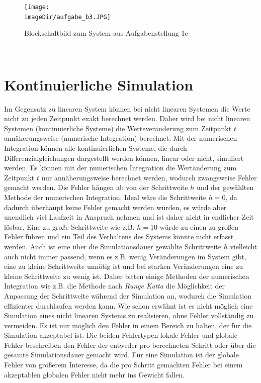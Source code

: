\documentclass[11pt, a4paper, twoside]{article}   	%
\newcommand{\imageDir}{./images/}
\begin{document}
\begin{figure}
\centering
\texttt{[image: \\imageDir/aufgabe\_b3.JPG]}
\caption{Blockschaltbild zum System aus Aufgabenstellung 1c}
\label{fig:exercise-b1}
\end{figure}
\ \newpage

\section{Kontinuierliche Simulation}
\label{sec:continous-simulation}
Im Gegensatz zu linearen System können bei nicht linearen Systemen die Werte nicht zu jeden Zeitpunkt exakt berechnet werden. Daher wird bei nicht linearen Systemen (kontinuierliche Systeme) die Werteveränderung zum Zeitpunkt $t$ annäherungsweise (numerische Integration) berechnet. Mit der numerischen Integration können alle kontinuierlichen Systeme, die durch Differenzialgleichungen dargestellt werden können, linear oder nicht,  simuliert werden. Es können mit der numerischen Integration die Wertänderung zum Zeitpunkt $t$ nur annäherungsweise berechnet werden, wodurch zwangsweise Fehler gemacht werden. Die Fehler hängen ab von der Schrittweite $h$ und der gewählten Methode der numerischen Integration.
\newline
\newline
Ideal wäre die Schrittweite $h=0$, da dadurch überhaupt keine Fehler gemacht werden würden, es würde aber unendlich viel Laufzeit in Anspruch nehmen und ist daher nicht in endlicher Zeit lösbar. Eine zu große Schrittweite wie z.B. $h=10$ würde zu einen zu großen Fehler führen und ein Teil des Verhaltens des Systems könnte nicht erfasst werden. Auch ist eine über die Simulationsdauer gewählte Schrittweite $h$ vielleicht auch nicht immer passend, wenn es z.B. wenig Veränderungen im System gibt, eine zu kleine Schrittweite unnötig ist und bei starken Veränderungen eine zu kleine Schrittweite zu wenig ist. Daher bitten einige Methoden der numerischen Integration wie z.B. die Methode nach \emph{Runge Kutta} die Möglichkeit der Anpassung der Schrittweite während der Simulation an, wodurch die Simulation effizienter durchlaufen werden kann.
\newline
\newline
Wie schon erwähnt ist es nicht möglich eine Simulation eines nicht linearen Systems zu realisieren, ohne Fehler vollständig zu vermeiden. Es ist nur möglich den Fehler in einem Bereich zu halten, der für die Simulation akzeptabel ist. Die beiden Fehlertypen lokale Fehler und globale Fehler beschreiben den Fehler der entweder pro berechneten Schritt oder über die gesamte Simulationsdauer gemacht wird. Für eine Simulation ist der globale Fehler von größerem Interesse, da die pro Schritt gemachten Fehler bei einem akzeptablen globalen Fehler nicht mehr ins Gewicht fallen.
\end{document}
